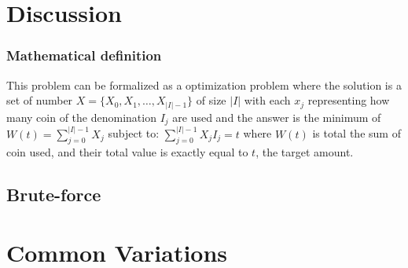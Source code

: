 \section{Discussion}
\label{coin_change:sec:discussion}
\subsubsection{Mathematical definition}
This problem can be formalized as a optimization problem where the solution is a set of number $X=\{X_0,X_1,\ldots, X_{|I|-1}\}$ of size $|I|$ with each $x_j$ representing how many coin of the denomination $I_j$ are used and the answer is the minimum of 
$
	W(t) = \sum_{j=0}^{|I|-1} X_j
$
subject to:
$
	\sum_{j=0}^{|I|-1} X_j I_j = t
$
where $W(t)$ is total the sum of coin used, and their total value is exactly equal to $t$, the target amount.

\subsection{Brute-force}
\label{coin_change:sec:bruteforce}





\section{Common Variations}